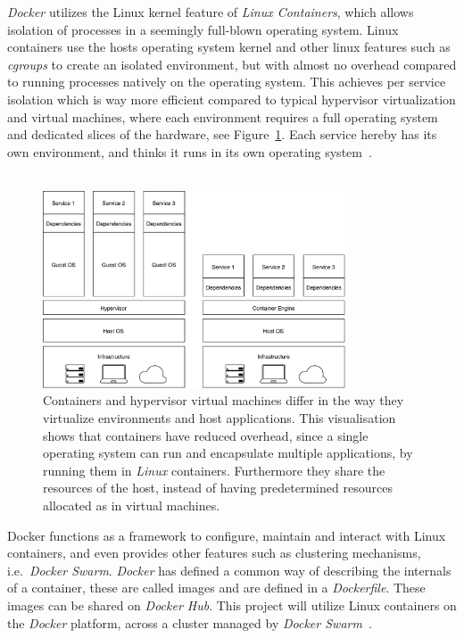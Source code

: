 \textit{Docker} utilizes the Linux kernel feature of \textit{Linux Containers},
which allows isolation of processes in a seemingly full-blown operating system.
Linux containers use the hosts operating system kernel and other linux features
such as \textit{cgroups} to create an isolated environment, but with almost no
overhead compared to running processes natively on the operating system. 
This achieves per service isolation which is way more efficient compared to typical
hypervisor virtualization and virtual machines, where each environment requires
a full operating system and dedicated slices of the hardware, see
Figure~\ref{fig:hypervisorvscontainer}. Each service hereby has its own
environment, and thinks it runs in its own operating system~\cite{docker}.
\\\\
\begin{figure}[H]
\centering
\includegraphics[width=0.8\textwidth]{../media/hypervisorvscontainer.pdf}
\caption{Containers and hypervisor virtual machines differ in the way they 
	virtualize environments and host applications. This visualisation shows that 
	containers have reduced overhead, since a single operating system can run 
	and encapsulate multiple applications, by running them in \textit{Linux} 
	containers. Furthermore they share the resources of the host, instead of 
	having predetermined resources allocated as in virtual machines.}
\label{fig:hypervisorvscontainer}
\end{figure}

Docker functions as a framework to configure, maintain and interact with Linux
containers, and even provides other features such as clustering mechanisms, i.e.\
\textit{Docker Swarm}. \textit{Docker} has defined a common way of describing
the internals of a container, these are called images and are defined in a
\textit{Dockerfile}. These images can be shared on \textit{Docker Hub}.
This project will utilize Linux containers on the \textit{Docker} platform,
across a cluster managed by \textit{Docker
Swarm}~\cite{docker,dockerhub,dockerswarm}.
